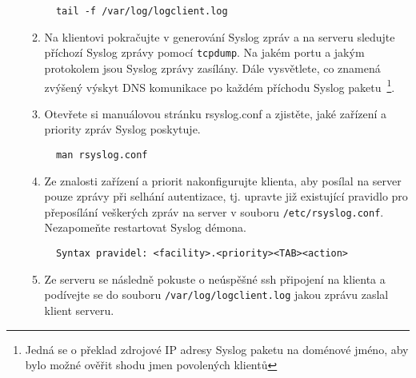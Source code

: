 \begin{itemize}
\begin{enumerate}
\begin{verbatim} 
  tail -f /var/log/logclient.log
\end{verbatim} 

            \item  Na klientovi pokračujte v generování Syslog zpráv a 
         na serveru sledujte příchozí Syslog zprávy pomocí {\tt tcpdump}. Na jakém
         portu a jakým protokolem jsou Syslog zprávy zasílány. Dále vysvětlete,
         co znamená zvýšený výskyt DNS komunikace po každém příchodu Syslog
         paketu~\footnote{Jedná se o překlad zdrojové IP adresy Syslog paketu na doménové
         jméno, aby bylo možné ověřit shodu jmen povolených klientů}.

            \item Otevřete si manuálovou stránku rsyslog.conf a zjistěte, jaké zařízení a priority
         zpráv Syslog poskytuje. 
\begin{verbatim} 
  man rsyslog.conf
\end{verbatim} 
        
         \item Ze znalosti zařízení a priorit nakonfigurujte klienta, aby posílal na server 
         pouze zprávy při selhání autentizace, tj. upravte již existující pravidlo pro přeposílání
         veškerých zpráv na server v souboru {\tt /etc/rsyslog.conf}. Nezapomeňte restartovat Syslog démona. 
         
\begin{verbatim} 
  Syntax pravidel: <facility>.<priority><TAB><action>
\end{verbatim} 
         \item Ze serveru se následně pokuste o neúspěšné ssh připojení na klienta a podívejte se
         do souboru {\tt /var/log/logclient.log} jakou zprávu zaslal klient serveru.


       \end{enumerate}
   \end{itemize}


